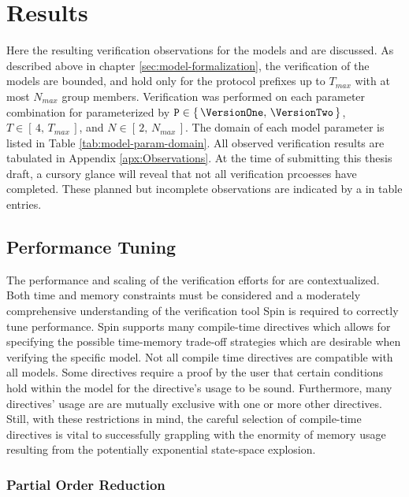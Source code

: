 \hypertarget{sec:results}{%
\chapter{Results}\label{sec:results}}

Here the resulting verification observations for the models \CGKAmod{\VersionOne}{}{} and \CGKAmod{\VersionTwo}{}{} are discussed.
As described above in chapter \ref{sec:model-formalization}, the verification of the models are bounded, and hold only for the protocol prefixes up to \( T_{max} \) with at most \( N_{max }\) group members.
Verification was performed on each parameter combination for  parameterized by \( \mathtt{P} \in \{\, \VersionOne ,\, \VersionTwo \,\} \), \( T \in [\,4,\, T_{max} \,] \), and \( N \in [\,2,\, N_{max} \,] \).
The domain of each  model parameter is listed in Table \ref{tab:model-param-domain}.
All observed verification results are tabulated in Appendix \ref{apx:Observations}.
At the time of submitting this thesis draft, a cursory glance will reveal that not all verification prcoesses have completed.
These planned but incomplete observations are indicated by a \NA in table entries.


\hypertarget{performance-tuning}{%
\section{Performance Tuning}\label{performance-tuning}}

The performance and scaling of the verification efforts for \CGKAmod{}{}{} are contextualized.
Both time and memory constraints must be considered and a moderately comprehensive understanding of the verification tool Spin is required to correctly tune performance.
Spin supports many compile-time directives which allows for specifying the possible time-memory trade-off strategies which are desirable when verifying the specific model.
Not all compile time directives are compatible with all models.
Some directives require a proof by the user that certain conditions hold within the model for the directive's usage to be sound.
Furthermore, many directives' usage are are mutually exclusive with one or more other directives.
Still, with these restrictions in mind, the careful selection of compile-time directives is vital to successfully grappling with the enormity of memory usage resulting from the potentially exponential state-space explosion.


\hypertarget{sec:partial-order-reduction}{%
\subsection{Partial Order Reduction}\label{sec:partial-order-reduction}}

